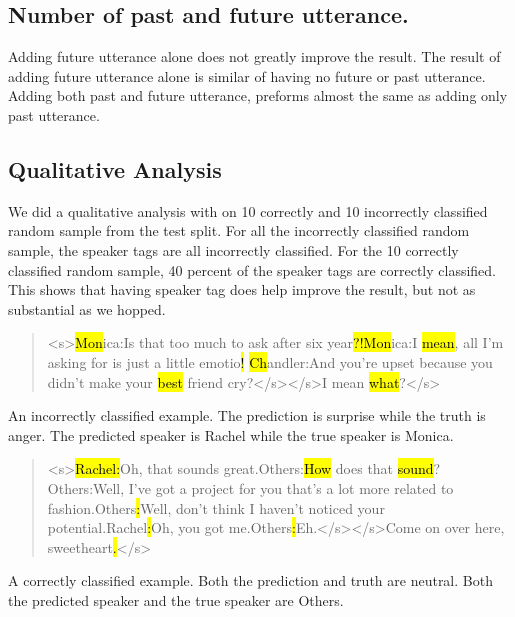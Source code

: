 \documentclass[11pt]{article}
\begin{document}
\subsection{Number of past and future utterance.}

Adding future utterance alone does not greatly improve the result. The result of adding future utterance alone is similar of having no future or past utterance. Adding both past and future utterance, preforms almost the same as adding only past utterance. 

\subsection{Qualitative Analysis}

We did a qualitative analysis with on 10 correctly and 10 incorrectly classified random sample from the test split. For all the incorrectly classified random sample, the speaker tags are all incorrectly classified. For the 10 correctly classified random sample, 40 percent of the speaker tags are correctly classified. This shows that having speaker tag does help improve the result, but not as substantial as we hopped. 

\begin{quote}

<s>\hl{Mon}ica:Is that too much to ask after six year\hl{?!}\hl{Mon}ica:I \hl{mean}, all I’m asking for is just a little emotio\hl{!} \hl{Ch}andler:And you’re upset because you didn’t make your \hl{best} friend cry?</s></s>I mean \hl{what}?</s>

\end{quote}

An incorrectly classified example. The prediction is surprise while the truth is anger. The predicted speaker is Rachel while the true speaker is Monica.

\begin{quote}

<s>\hl{Rachel}\hl{:}Oh, that sounds great.Others:\hl{How} does that \hl{sound}?Others:Well, I’ve got a project for you that’s a lot more related to fashion.Others\hl{:}Well, don’t think I haven’t noticed your potential.Rachel\hl{:}Oh, you got me.Others\hl{:}Eh.</s></s>Come on over here, sweetheart\hl{.}</s>

\end{quote}

A correctly classified example. Both the prediction and truth are neutral. Both the predicted speaker and the true speaker are Others. \\
\end{document}
